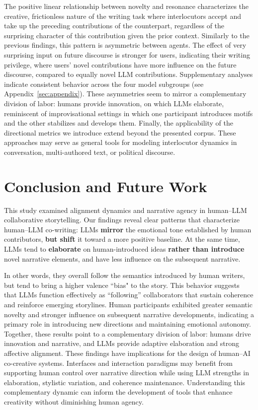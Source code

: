 \documentclass[11pt]{article}
\begin{document}
The positive linear relationship between novelty and resonance characterizes the creative, frictionless nature of the writing task where interlocutors accept and take up the preceding contributions of the counterpart, regardless of the surprising character of this contribution given the prior context. Similarly to the previous findings, this pattern is asymmetric between agents. The effect of very surprising input on future discourse is stronger for users, indicating their writing privilege, where users' novel contributions have more influence on the future discourse, compared to equally novel LLM contributions. Supplementary analyses indicate consistent behavior across the four model subgroups (see Appendix~\ref{sec:appendix}).
These asymmetries seem to mirror a complementary division of labor: humans provide innovation, on which LLMs elaborate, reminiscent of improvisational settings in which one participant introduces motifs and the other stabilizes and develops them.%
Finally, the applicability of the directional metrics we introduce extend beyond the presented corpus. These approaches may serve as general tools for modeling interlocutor dynamics in conversation, multi-authored text, or political discourse.

\section{Conclusion and Future Work}
This study examined alignment dynamics and narrative agency in human–LLM collaborative storytelling. Our findings reveal clear patterns that characterize human–LLM co-writing: LLMs \textbf{mirror} the emotional tone established by human contributors, \textbf{but shift} it toward a more positive baseline. At the same time, LLMs tend to \textbf{elaborate} on human-introduced ideas \textbf{rather than introduce} novel narrative elements, and have less influence on the subsequent narrative.

In other words, they overall follow the semantics introduced by human writers, but tend to bring a higher valence ``bias" to the story. This behavior suggests that LLMs function effectively as ``following'' collaborators that sustain coherence and reinforce emerging storylines.
Human participants exhibited greater semantic novelty and stronger influence on subsequent narrative developments, indicating a primary role in introducing new directions and maintaining emotional autonomy. Together, these results point to a complementary division of labor: humans drive innovation and narrative, and LLMs provide adaptive elaboration and strong affective alignment.
These findings have implications for the design of human–AI co-creative systems. Interfaces and interaction paradigms may benefit from supporting human control over narrative direction while using LLM strengths in elaboration, stylistic variation, and coherence maintenance. Understanding this complementary dynamic can inform the development of tools that enhance creativity without diminishing human agency.
\end{document}
